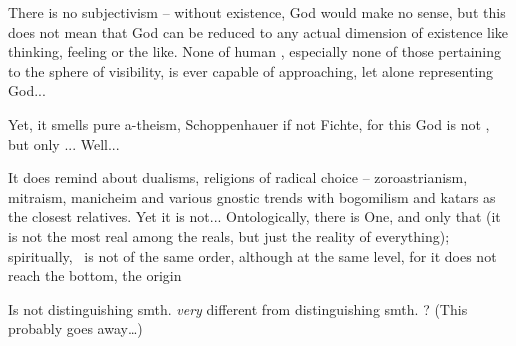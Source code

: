 There is no subjectivism -- without existence, God would make no sense, but this
does not mean that God can be reduced to any actual dimension of existence like
thinking, feeling or the like. None of human , especially none of
those pertaining to the sphere of visibility, is ever capable of approaching,
let alone representing God...

Yet, it smells pure a-theism, Schoppenhauer if not Fichte, for this God is not
, but only ... Well...


It does remind about dualisms, religions of radical choice --
zoroastrianism, mitraism, manicheim and various gnostic trends with bogomilism
and katars as the closest relatives. Yet it is not... Ontologically, there is
One, and only that (it is not the most real among the reals, but just the
reality of everything); spiritually, \No\ is not of the same order, although at
the same level, for it does not reach the bottom, the origin

\pa
Is not distinguishing smth.  {\em very} different 
from distinguishing smth. ? (This probably goes 
away\ldots)

